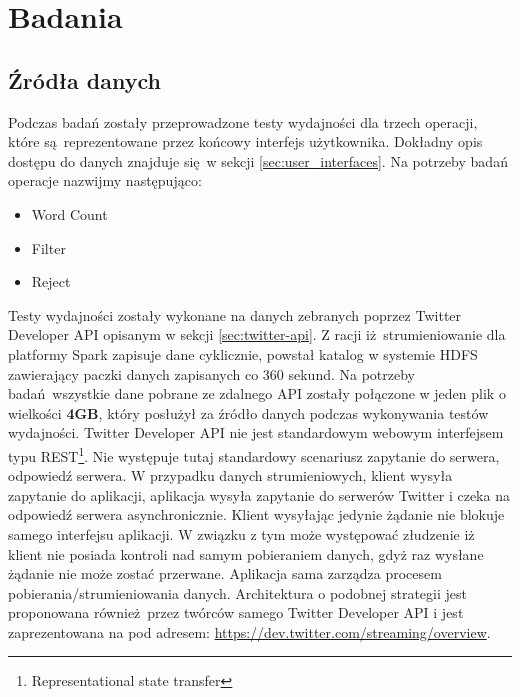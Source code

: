\chapter{Badania}
\section{Źródła danych}
Podczas badań zostały przeprowadzone testy wydajności dla trzech operacji, które są reprezentowane przez końcowy interfejs użytkownika. Dokładny opis dostępu do danych znajduje się w sekcji \ref{sec:user_interfaces}. 
Na potrzeby badań operacje nazwijmy następująco:
\begin{itemize}
	\item {Word Count}
	\item {Filter}
	\item {Reject}
\end{itemize}
Testy wydajności zostały wykonane na danych zebranych poprzez Twitter Developer API opisanym w sekcji \ref{sec:twitter-api}. Z racji iż strumieniowanie dla platformy Spark zapisuje dane cyklicznie, powstał katalog w systemie HDFS zawierający paczki danych zapisanych co 360 sekund. Na potrzeby badań wszystkie dane pobrane ze zdalnego API zostały połączone w jeden plik o wielkości \textbf{4GB}, który posłużył za źródło danych podczas wykonywania testów wydajności. Twitter Developer API nie jest standardowym webowym interfejsem typu REST\footnote{Representational state transfer}. Nie występuje tutaj standardowy scenariusz zapytanie do serwera, odpowiedź serwera. W przypadku danych strumieniowych, klient wysyła zapytanie do aplikacji, aplikacja wysyła zapytanie do serwerów Twitter i czeka na odpowiedź serwera asynchronicznie. Klient wysyłając jedynie żądanie nie blokuje samego interfejsu aplikacji. W związku z tym może występować złudzenie iż klient nie posiada kontroli nad samym pobieraniem danych, gdyż raz wysłane żądanie nie może zostać przerwane. Aplikacja sama zarządza procesem pobierania/strumieniowania danych. Architektura o podobnej strategii jest proponowana również przez twórców samego Twitter Developer API i jest zaprezentowana na pod adresem: \url{https://dev.twitter.com/streaming/overview}.
